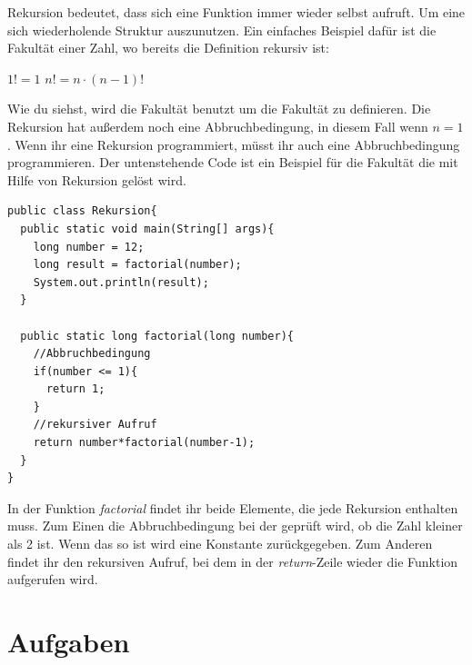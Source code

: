 Rekursion bedeutet, dass sich eine Funktion immer wieder selbst aufruft. Um eine sich wiederholende Struktur auszunutzen. Ein einfaches Beispiel dafür ist die Fakultät einer Zahl, wo bereits die Definition rekursiv ist:

\begin{center}
	$1! = 1$
	$n! = n\cdot (n-1)!$
\end{center}

Wie du siehst, wird die Fakultät benutzt um die Fakultät zu definieren. Die Rekursion hat außerdem noch eine Abbruchbedingung, in diesem Fall wenn $n=1$. Wenn ihr eine Rekursion programmiert, müsst ihr auch eine Abbruchbedingung programmieren. Der untenstehende Code ist ein Beispiel für die Fakultät die mit Hilfe von Rekursion gelöst wird.

\begin{minipage}{\textwidth}
\begin{lstlisting}
public class Rekursion{
  public static void main(String[] args){
    long number = 12;
    long result = factorial(number);
    System.out.println(result);
  }
  
  public static long factorial(long number){
    //Abbruchbedingung
    if(number <= 1){
      return 1;
    }
    //rekursiver Aufruf
    return number*factorial(number-1);
  }
}
\end{lstlisting}
\end{minipage}

In der Funktion \textit{factorial} findet ihr beide Elemente, die jede Rekursion enthalten muss. Zum Einen die Abbruchbedingung bei der geprüft wird, ob die Zahl kleiner als 2 ist. Wenn das so ist wird eine Konstante zurückgegeben. Zum Anderen findet ihr den rekursiven Aufruf, bei dem in der \textit{return}-Zeile wieder die Funktion aufgerufen wird.

\section{Aufgaben}

